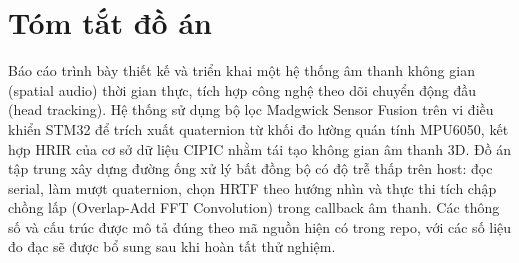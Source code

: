 \chapter*{Tóm tắt đồ án}
Báo cáo trình bày thiết kế và triển khai một hệ thống âm thanh không gian (spatial audio) thời gian thực, tích hợp công nghệ theo dõi chuyển động đầu (head tracking). Hệ thống sử dụng bộ lọc Madgwick Sensor Fusion trên vi điều khiển STM32 để trích xuất quaternion từ khối đo lường quán tính MPU6050, kết hợp HRIR của cơ sở dữ liệu CIPIC nhằm tái tạo không gian âm thanh 3D. Đồ án tập trung xây dựng đường ống xử lý bất đồng bộ có độ trễ thấp trên host: đọc serial, làm mượt quaternion, chọn HRTF theo hướng nhìn và thực thi tích chập chồng lấp (Overlap-Add FFT Convolution) trong callback âm thanh. Các thông số và cấu trúc được mô tả đúng theo mã nguồn hiện có trong repo, với các số liệu đo đạc sẽ được bổ sung sau khi hoàn tất thử nghiệm.

\tableofcontents
\newpage
\listoffigures
\listoftables
\listofalgorithms
\newpage

